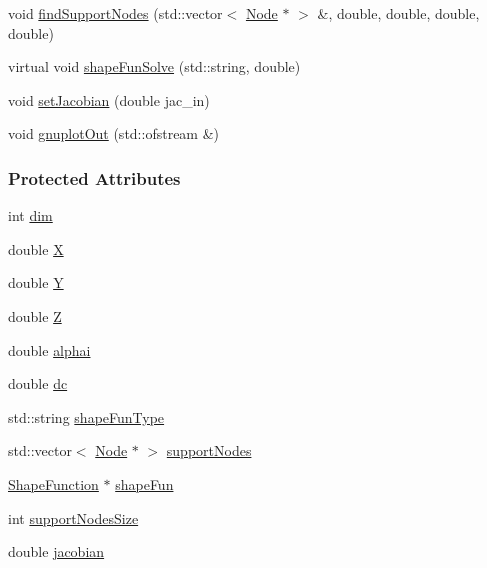 \begin{DoxyCompactItemize}
\item 
void \hyperlink{classmknix_1_1_point_a13907374f703f15ffda3bb376bd19073}{find\-Support\-Nodes} (std\-::vector$<$ \hyperlink{classmknix_1_1_node}{Node} $\ast$ $>$ \&, double, double, double, double)
\item 
virtual void \hyperlink{classmknix_1_1_point_a1843d81646fbca9519358eb3c8787e18}{shape\-Fun\-Solve} (std\-::string, double)
\item 
void \hyperlink{classmknix_1_1_point_aea25863c7bab8e63c09ca394546a5502}{set\-Jacobian} (double jac\-\_\-in)
\item 
void \hyperlink{classmknix_1_1_point_ad985b1bb6595c64f6bfc60b557e86ec9}{gnuplot\-Out} (std\-::ofstream \&)
\end{DoxyCompactItemize}
\subsubsection*{Protected Attributes}
\begin{DoxyCompactItemize}
\item 
int \hyperlink{classmknix_1_1_point_ab97e4bca7f299237ff3f8cc2449b1be1}{dim}
\item 
double \hyperlink{classmknix_1_1_point_a1ab5edb86e6de2df07c3d11ed7c2ca99}{X}
\item 
double \hyperlink{classmknix_1_1_point_aeb9947adb5c6a4cd01ca81f4c4934ed5}{Y}
\item 
double \hyperlink{classmknix_1_1_point_a1742974a0d33897c3b04bc420ef87d31}{Z}
\item 
double \hyperlink{classmknix_1_1_point_afbd74e8b9e7081984e5b03d802f7ae14}{alphai}
\item 
double \hyperlink{classmknix_1_1_point_a310b40e3859627d344de048bbdb1db6f}{dc}
\item 
std\-::string \hyperlink{classmknix_1_1_point_a60c4d06445f397a9813b9a7f2a563d0d}{shape\-Fun\-Type}
\item 
std\-::vector$<$ \hyperlink{classmknix_1_1_node}{Node} $\ast$ $>$ \hyperlink{classmknix_1_1_point_ad258bb20504bbe5c32360f73ec62671a}{support\-Nodes}
\item 
\hyperlink{classmknix_1_1_shape_function}{Shape\-Function} $\ast$ \hyperlink{classmknix_1_1_point_a852c997f667d6029c6062ef68582c275}{shape\-Fun}
\item 
int \hyperlink{classmknix_1_1_point_af2f2861988d3dfd6625822140f8e04d3}{support\-Nodes\-Size}
\item 
double \hyperlink{classmknix_1_1_point_a7afc6bd82b8e3619d384a41d9c2f1601}{jacobian}
\end{DoxyCompactItemize}
